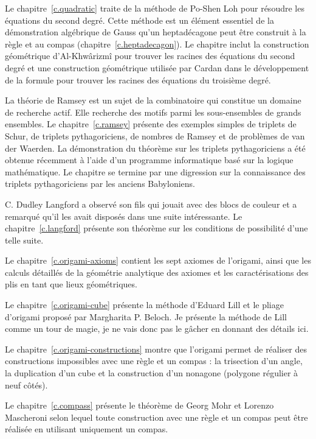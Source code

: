 Le chapitre~\ref{c.quadratic} traite de la méthode de Po-Shen Loh pour résoudre les équations du second degré. Cette méthode est un élément essentiel de la démonstration algébrique de Gauss qu'un heptadécagone peut être construit à la règle et au compas (chapitre~\ref{c.heptadecagon}). Le chapitre inclut la construction géométrique d'Al-Khwârizmî pour trouver les racines des équations du second degré et une construction géométrique utilisée par Cardan dans le développement de la formule pour trouver les racines des équations du troisième degré.

La théorie de Ramsey est un sujet de la combinatoire qui constitue un domaine de recherche actif. Elle recherche des motifs parmi les sous-ensembles de grands ensembles. Le chapitre~\ref{c.ramsey} présente des exemples simples de triplets de Schur, de triplets pythagoriciens, de nombres de Ramsey et de problèmes de van der Waerden. La démonstration du théorème sur les triplets pythagoriciens a été obtenue récemment à l'aide d'un programme informatique basé sur la logique mathématique. Le chapitre se termine par une digression sur la connaissance des triplets pythagoriciens par les anciens Babyloniens.

C. Dudley Langford a observé son fils qui jouait avec des blocs de couleur et a remarqué qu'il les avait disposés dans une suite intéressante. Le chapitre~\ref{c.langford} présente son théorème sur les conditions de possibilité d'une telle suite.

Le chapitre~\ref{c.origami-axioms} contient les sept axiomes de l'origami, ainsi que les calculs détaillés de la géométrie analytique des axiomes et les caractérisations des plis en tant que lieux géométriques.

Le chapitre~\ref{c.origami-cube} présente la méthode d'Eduard Lill et le pliage d'origami proposé par Margharita P. Beloch. Je présente la méthode de Lill comme un tour de magie, je ne vais donc pas le gâcher en donnant des détails ici.

Le chapitre~\ref{c.origami-constructions} montre que l'origami permet de réaliser des constructions impossibles avec une règle et un compas : la trisection d'un angle, la duplication d'un cube et la construction d'un nonagone (polygone régulier à neuf côtés).

Le chapitre~\ref{c.compass} présente le théorème de Georg Mohr et Lorenzo Mascheroni selon lequel toute construction avec une règle et un compas peut être réalisée en utilisant uniquement un compas.


